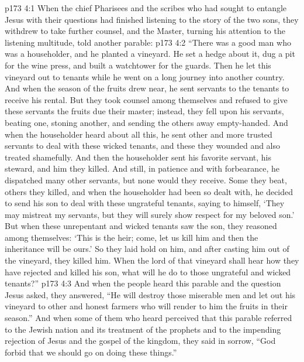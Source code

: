 \vs p173 4:1 When the chief Pharisees and the scribes who had sought to entangle Jesus with their questions had finished listening to the story of the two sons, they withdrew to take further counsel, and the Master, turning his attention to the listening multitude, told another parable:
\pc \vs p173 4:2 \textcolor{ubdarkred}{“There was a good man who was a householder, and he planted a vineyard. He set a hedge about it, dug a pit for the wine press, and built a watchtower for the guards. Then he let this vineyard out to tenants while he went on a long journey into another country. And when the season of the fruits drew near, he sent servants to the tenants to receive his rental. But they took counsel among themselves and refused to give these servants the fruits due their master; instead, they fell upon his servants, beating one, stoning another, and sending the others away empty\hyp{}handed. And when the householder heard about all this, he sent other and more trusted servants to deal with these wicked tenants, and these they wounded and also treated shamefully. And then the householder sent his favorite servant, his steward, and him they killed. And still, in patience and with forbearance, he dispatched many other servants, but none would they receive. Some they beat, others they killed, and when the householder had been so dealt with, he decided to send his son to deal with these ungrateful tenants, saying to himself, ‘They may mistreat my servants, but they will surely show respect for my beloved son.’ But when these unrepentant and wicked tenants saw the son, they reasoned among themselves: ‘This is the heir; come, let us kill him and then the inheritance will be ours.’ So they laid hold on him, and after casting him out of the vineyard, they killed him. When the lord of that vineyard shall hear how they have rejected and killed his son, what will he do to those ungrateful and wicked tenants?”}
\pc \vs p173 4:3 And when the people heard this parable and the question Jesus asked, they answered, “He will destroy those miserable men and let out his vineyard to other and honest farmers who will render to him the fruits in their season.” And when some of them who heard perceived that this parable referred to the Jewish nation and its treatment of the prophets and to the impending rejection of Jesus and the gospel of the kingdom, they said in sorrow, “God forbid that we should go on doing these things.”
